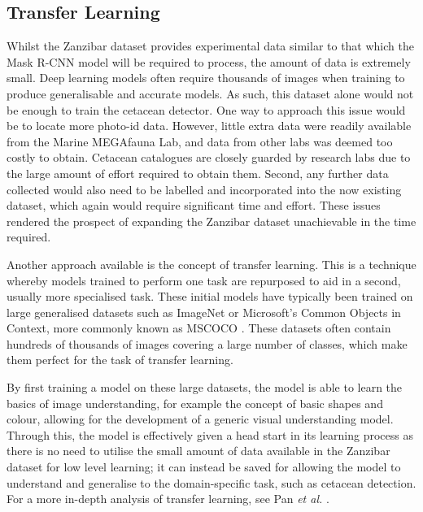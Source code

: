 \subsection{Transfer Learning}\label{ch:cetDet,sec:initialTesting,sub:transferLearning}

Whilst the Zanzibar dataset provides experimental data similar to that which the Mask R-CNN model will be required to process, the amount of data is extremely small. Deep learning models often require thousands of images when training to produce generalisable and accurate models. As such, this dataset alone would not be enough to train the cetacean detector. One way to approach this issue would be to locate more photo-id data. However, little extra data were readily available from the Marine MEGAfauna Lab, and data from other labs was deemed too costly to obtain. Cetacean catalogues are closely guarded by research labs due to the large amount of effort required to obtain them. Second, any further data collected would also need to be labelled and incorporated into the now existing dataset, which again would require significant time and effort. These issues rendered the prospect of expanding the Zanzibar dataset unachievable in the time required. 

Another approach available is the concept of transfer learning. This is a technique whereby models trained to perform one task are repurposed to aid in a second, usually more specialised task. These initial models have typically been trained on large generalised datasets such as ImageNet \cite{deng_imagenet:_2009} or Microsoft's Common Objects in Context, more commonly known as MSCOCO \cite{lin_microsoft_2014}. These datasets often contain hundreds of thousands of images covering a large number of classes, which make them perfect for the task of transfer learning. 

By first training a model on these large datasets, the model is able to learn the basics of image understanding, for example the concept of basic shapes and colour, allowing for the development of a generic visual understanding model. Through this, the model is effectively given a head start in its learning process as there is no need to utilise the small amount of data available in the Zanzibar dataset for low level learning; it can instead be saved for allowing the model to understand and generalise to the domain-specific task, such as cetacean detection. For a more in-depth analysis of transfer learning, see Pan \textit{et al.} \cite{pan_survey_2010}.

